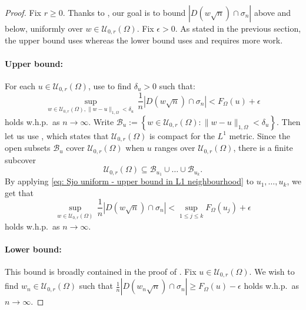 \documentclass{article}
\theoremstyle{remark}
\newcommand{\card}[1]{\left|#1\right|}
\def\Usjo{\mathcal{U}}
\begin{document}
\begin{proof}
    Fix $r\ge0$.
    Thanks to , our goal is to bound $\card{D(w\sqrt n)\cap\sigma_n}$ above and below, uniformly over $w\in\Usjo_{0,r}(\Omega)$.
    Fix $\epsilon>0$.
    As stated in the previous section, the upper bound uses  whereas the lower bound uses  and requires more work.

    \paragraph{Upper bound:}
    For each $u\in\Usjo_{0,r}(\Omega)$, use  to find $\delta_u>0$ such that:
    \begin{equation}\label{eq: Sjo uniform - upper bound in L1 neighbourhood}
        \sup_{w\in\Usjo_{0,r}(\Omega) , \lVert w-u \rVert_{1,\Omega} < \delta_u} \,
        \frac1n \card{ D(w\sqrt n) \cap \sigma_n } < F_\Omega(u) + \epsilon 
    \end{equation}
    holds w.h.p.~as $n\to\infty$.
    Write $\mathcal{B}_u := \left\{ w\in\Usjo_{0,r}(\Omega) : \lVert w-u \rVert_{1,\Omega} < \delta_u \right\}$.
    Then let us use \cite[Proposition~9.2]{S23}, which states that $\Usjo_{0,r}\left(\Omega\right)$ is compact for the $L^1$ metric.
    Since the open subsets $\mathcal{B}_u$ cover $\Usjo_{0,r}\left(\Omega\right)$ when $u$ ranges over $\Usjo_{0,r}\left(\Omega\right)$, there is a finite subcover 
    \[
        \Usjo_{0,r}\left(\Omega\right) \subseteq \mathcal{B}_{u_1} \cup \dots \cup \mathcal{B}_{u_k} .
    \]
    By applying \eqref{eq: Sjo uniform - upper bound in L1 neighbourhood} to $u_1, \dots, u_k$, we get that
    \begin{equation}\label{eq: Sjo uniform - final upper bound}
        \sup_{w\in\Usjo_{0,r}(\Omega)} \,
        \frac1n \card{ D(w\sqrt n) \cap \sigma_n } < \sup_{1\le j\le k}F_\Omega(u_j) + \epsilon 
    \end{equation}
    holds w.h.p.~as $n\to\infty$.
    
    \paragraph{Lower bound:}
    This bound is broadly contained in the proof of \cite[Lemma~10.1]{S23}.
    Fix $u\in\Usjo_{0,r}(\Omega)$.
    We wish to find $w_n\in \Usjo_{0,r}\left(\Omega\right)$ such that $\frac1n \card{D(w_n\sqrt n)\cap\sigma_n} \ge F_{\Omega}(u) - \epsilon$ holds w.h.p.~as $n\to\infty$.


\end{proof}
\end{document}
